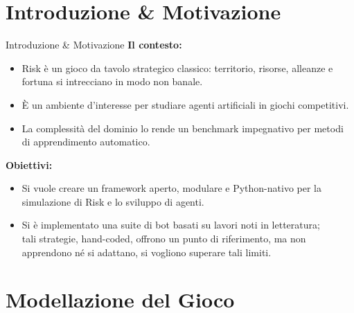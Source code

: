 \documentclass[9pt,serif,usenames,dvipsnames]{beamer}
\begin{document}
	\section{Introduzione \& Motivazione}

	\begin{frame}{\centering Introduzione \& Motivazione}
		\textbf{Il contesto:}
		\begin{itemize}
			\item \alert{Risk} è un gioco da tavolo strategico classico: territorio,
			risorse, alleanze e fortuna si intrecciano in modo non banale.
			\item È un ambiente d'interesse per studiare \alert{agenti artificiali} in giochi
			competitivi.
			\item La complessità del dominio lo rende un \alert{benchmark impegnativo}
			per metodi di apprendimento automatico.
		\end{itemize}

		\vspace{0.1cm}
		\textbf{Obiettivi:}
		\begin{itemize}
			\item Si vuole creare un framework \alert{aperto, modulare e Python-nativo}
			per la simulazione di Risk e lo sviluppo di agenti.
			\item Si è implementato una suite di bot basati su lavori noti in letteratura;
			\\ tali strategie, \alert{hand-coded}, offrono un punto di riferimento, \alert{ma}
			non apprendono né si adattano, si vogliono superare tali limiti.
		\end{itemize}
	\end{frame}

	\section{Modellazione del Gioco}
\end{document}

